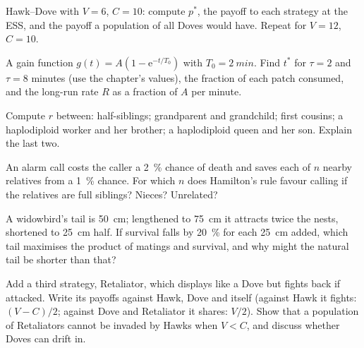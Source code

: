 \begin{exercise}[$\star\star$]\label{exo:b3:behavioural-ecology:5}
Hawk--Dove with $V = 6$, $C = 10$: compute $p^{*}$, the payoff to each
strategy at the ESS, and the payoff a population of all Doves would
have. Repeat for $V = 12$, $C = 10$.
\end{exercise}

\begin{exercise}[$\star\star$]\label{exo:b3:behavioural-ecology:6}
A gain function $g(t) = A(1 - \mathrm{e}^{-t/T_{0}})$ with $T_{0} =
\qty{2}{min}$. Find $t^{*}$ for $\tau = 2$ and $\tau = 8$ minutes (use
the chapter's values), the fraction of each patch consumed, and the
long-run rate $R$ as a fraction of $A$ per minute.
\end{exercise}

\begin{exercise}[$\star\star$]\label{exo:b3:behavioural-ecology:7}
Compute $r$ between: half-siblings; grandparent and grandchild; first
cousins; a haplodiploid worker and her brother; a haplodiploid queen
and her son. Explain the last two.
\end{exercise}

\begin{exercise}[$\star\star$]\label{exo:b3:behavioural-ecology:8}
An alarm call costs the caller a \qty{2}{\%} chance of death and saves
each of $n$ nearby relatives from a \qty{1}{\%} chance. For which $n$
does Hamilton's rule favour calling if the relatives are full siblings?
Nieces? Unrelated?
\end{exercise}

\begin{exercise}[$\star\star$]\label{exo:b3:behavioural-ecology:9}
A widowbird's tail is \qty{50}{cm}; lengthened to \qty{75}{cm} it
attracts twice the nests, shortened to \qty{25}{cm} half. If survival
falls by \qty{20}{\%} for each \qty{25}{cm} added, which tail maximises
the product of matings and survival, and why might the natural tail be
shorter than that?
\end{exercise}

\begin{exercise}[$\star\star\star$]\label{exo:b3:behavioural-ecology:10}
Add a third strategy, Retaliator, which displays like a Dove but
fights back if attacked. Write its payoffs against Hawk, Dove and
itself (against Hawk it fights: $(V - C)/2$; against Dove and
Retaliator it shares: $V/2$). Show that a population of Retaliators
cannot be invaded by Hawks when $V < C$, and discuss whether Doves can
drift in.
\end{exercise}

